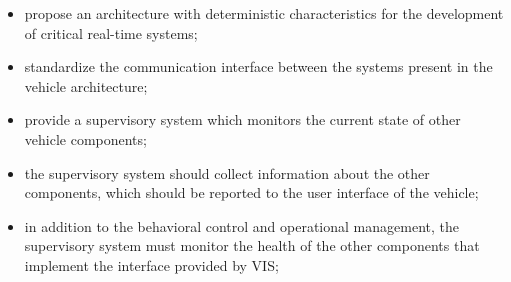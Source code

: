 \documentclass[conference]{IEEEtran}
\begin{document}
\begin{itemize}
	\item propose an architecture with deterministic characteristics for the development of critical real-time systems;
	\item standardize the communication interface between the systems present in the vehicle architecture;
	\item provide a supervisory system which monitors the current state of other vehicle components;
	\item the supervisory system should collect information about the other components, which should be reported to the user interface of the vehicle;
	\item in addition to the behavioral control and operational management, the supervisory system must monitor the health of the other components that implement the interface provided by VIS;

	
	
	
\end{itemize}


\end{document}
